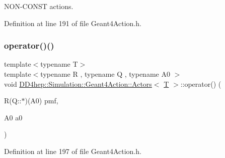 N\+O\+N-\/\+C\+O\+N\+ST actions. 



Definition at line 191 of file Geant4\+Action.\+h.

\hypertarget{class_d_d4hep_1_1_simulation_1_1_geant4_action_1_1_actors_a8633bd70a1557d0e6791f2be4a5680e4}{}\label{class_d_d4hep_1_1_simulation_1_1_geant4_action_1_1_actors_a8633bd70a1557d0e6791f2be4a5680e4} 
\subsubsection{\texorpdfstring{operator()()}{operator()()}\hspace{0.1cm}{\footnotesize\ttfamily [2/6]}}
{\footnotesize\ttfamily template$<$typename T$>$ \\
template$<$typename R , typename Q , typename A0 $>$ \\
void \hyperlink{class_d_d4hep_1_1_simulation_1_1_geant4_action_1_1_actors}{D\+D4hep\+::\+Simulation\+::\+Geant4\+Action\+::\+Actors}$<$ \hyperlink{class_t}{T} $>$\+::operator() (\begin{DoxyParamCaption}\item[{R(Q\+::$\ast$)(A0)}]{pmf,  }\item[{A0}]{a0 }\end{DoxyParamCaption})\hspace{0.3cm}{\ttfamily [inline]}}



Definition at line 197 of file Geant4\+Action.\+h.

\hypertarget{class_d_d4hep_1_1_simulation_1_1_geant4_action_1_1_actors_a173fec5bb570e095bee2001ef38909b1}{}\label{class_d_d4hep_1_1_simulation_1_1_geant4_action_1_1_actors_a173fec5bb570e095bee2001ef38909b1} 
